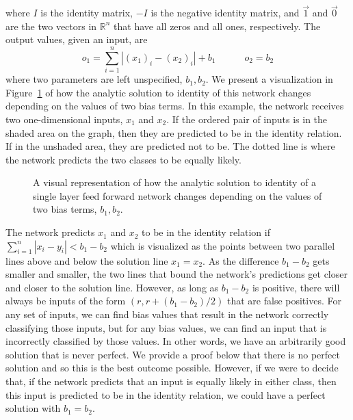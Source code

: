 %
where $I$ is the identity matrix, $-I$ is the negative identity matrix, and $\vec{1}$ and $\vec{0}$ are the two vectors in $\mathbb{R}^n$ that have all zeros and all ones, respectively. The output values, given an input, are
%
\[ o_1 = \sum_{i = 1}^{n}|(x_1)_i- (x_2)_i|+ b_1 \qquad \quad  o_2 = b_2\]
%
where two parameters are left unspecified, $b_1, b_2$. We present a visualization in Figure~\ref{fig:analyticff} of how the analytic solution to identity of this network changes depending on the values of two bias terms. In this example, the network receives two one-dimensional inputs, $x_1$ and $x_2$. If the ordered pair of inputs is in the shaded area on the graph, then they are predicted to be in the identity relation. If in the unshaded area, they are predicted not to be. The dotted line is where the network predicts the two classes to be equally likely.


\begin{figure}[h]
  \centering
  \newcommand\X{2}
  \newcommand\E{0.03}
  \caption{A visual representation of how the analytic solution to identity of a single layer feed forward network changes depending on the values of two bias terms, $b_1,b_2$.}
  \label{fig:analyticff}
\end{figure}

The network predicts $x_1$ and $x_2$ to be in the identity relation if $\sum_{i = 1}^{n}|x_i- y_i| < b_1-b_2$ which is visualized as the points between two parallel lines above and below the solution line $x_1 = x_2$. As the difference $b_1-b_2$ gets smaller and smaller, the two lines that bound the network's predictions get closer and closer to the solution line. However, as long as $b_1-b_2$ is positive, there will always be inputs of the form $(r,r+(b_1-b_2)/2)$ that are false positives. For any set of inputs, we can find bias values that result in the network correctly classifying those inputs, but for any bias values, we can find an input that is incorrectly classified by those values. In other words, we have an arbitrarily good solution that is never perfect. We provide a proof below that there is no perfect solution and so this is the best outcome possible. However, if we were to decide that, if the network predicts that an input is equally likely in either class, then this input is predicted to be in the identity relation, we could have a perfect solution with $b_1= b_2$.

